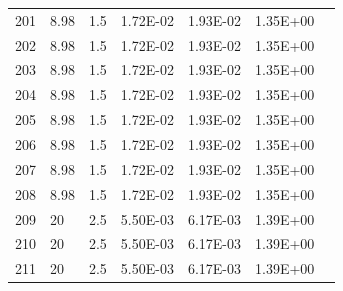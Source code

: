 \documentclass{article}
\begin{document}
\begin{landscape}
\begin{table}[]
\begin{tabular}{lllllll}
201    & 8.98                & 1.5                                       & 1.72E-02             & 1.93E-02             & 1.35E+00                                                                &  \\
202    & 8.98                & 1.5                                       & 1.72E-02             & 1.93E-02             & 1.35E+00                                                                &  \\
203    & 8.98                & 1.5                                       & 1.72E-02             & 1.93E-02             & 1.35E+00                                                                &  \\
204    & 8.98                & 1.5                                       & 1.72E-02             & 1.93E-02             & 1.35E+00                                                                &  \\
205    & 8.98                & 1.5                                       & 1.72E-02             & 1.93E-02             & 1.35E+00                                                                &  \\
206    & 8.98                & 1.5                                       & 1.72E-02             & 1.93E-02             & 1.35E+00                                                                &  \\
207    & 8.98                & 1.5                                       & 1.72E-02             & 1.93E-02             & 1.35E+00                                                                &  \\
208    & 8.98                & 1.5                                       & 1.72E-02             & 1.93E-02             & 1.35E+00                                                                &  \\
209    & 20                  & 2.5                                       & 5.50E-03             & 6.17E-03             & 1.39E+00                                                                &  \\
210    & 20                  & 2.5                                       & 5.50E-03             & 6.17E-03             & 1.39E+00                                                                &  \\
211    & 20                  & 2.5                                       & 5.50E-03             & 6.17E-03             & 1.39E+00                                                                &  \\

\end{tabular}
\end{table}
\end{landscape}
\end{document}
